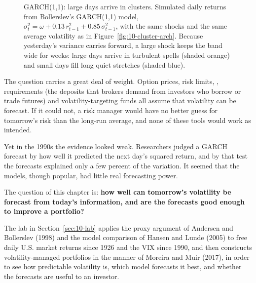 \begin{figure}[htbp]
{%
}
\caption[GARCH(1,1): large days arrive in clusters]{GARCH(1,1): large days arrive in clusters. Simulated daily returns from Bollerslev's GARCH(1,1) model, $\sigma_t^2 = \omega + 0.13\,r_{t-1}^2 + 0.85\,\sigma_{t-1}^2$, with the same shocks and the same average volatility as in Figure~\ref{fig:10-cluster-arch}. Because yesterday's variance carries forward, a large shock keeps the band wide for weeks: large days arrive in turbulent spells (shaded orange) and small days fill long quiet stretches (shaded blue).}
\label{fig:10-cluster-garch}
\end{figure}


The question carries a great deal of weight. Option prices, risk limits, \label{kt:value-at-risk},  requirements (the deposits that brokers demand from investors who borrow or trade futures) and volatility-targeting funds all assume that volatility can be forecast. If it could not, a risk manager would have no better guess for tomorrow's risk than the long-run average, and none of these tools would work as intended.

Yet in the 1990s the evidence looked weak. Researchers judged a GARCH forecast by how well it predicted the next day's squared return, and by that test the forecasts explained only a few percent of the variation. It seemed that the models, though popular, had little real forecasting power.

The question of this chapter is: \textbf{how well can tomorrow's volatility be forecast from today's information, and are the forecasts good enough to improve a portfolio?}

The lab in Section~\ref{sec:10-lab} applies the proxy argument of Andersen and Bollerslev (1998) and the model comparison of Hansen and Lunde (2005) to free daily U.S. market returns since 1926 and the VIX since 1990, and then constructs volatility-managed portfolios in the manner of Moreira and Muir (2017), in order to see how predictable volatility is, which model forecasts it best, and whether the forecasts are useful to an investor.


